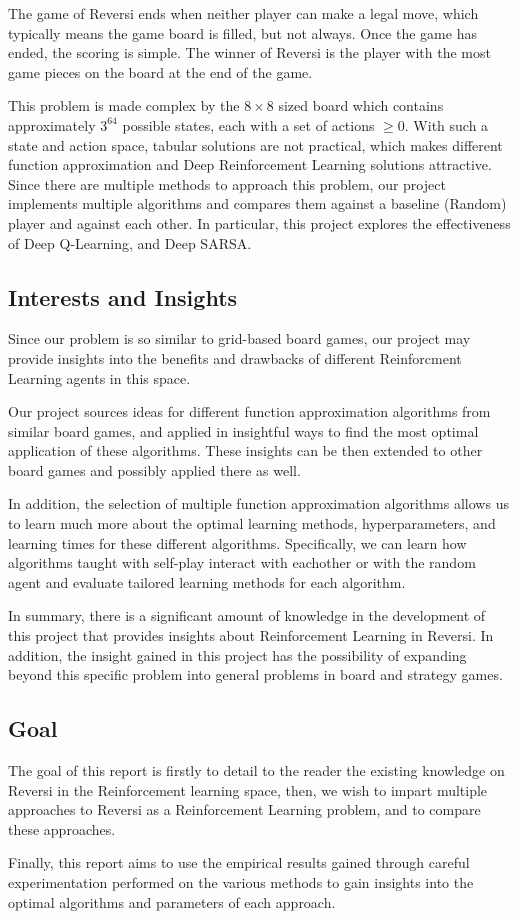 \documentclass[../report.tex]{subfiles}
\begin{document}
The game of Reversi ends when neither player can make a legal move, which typically means the game board is filled, but not always. Once the game has ended, the scoring is simple. The winner of Reversi is the player with the most game pieces on the board at the end of the game.


This problem is made complex by the $8\times8$ sized board which contains approximately $3^{64}$ possible states, each with a set of actions $\geq0$. With such a state and action space, tabular solutions are not practical, which makes different function approximation and Deep Reinforcement Learning solutions attractive. Since there are multiple methods to approach this problem, our project implements multiple algorithms and compares them against a baseline (Random) player and against each other. In particular, this project explores the effectiveness of Deep Q-Learning, and Deep SARSA. 

\subsection{Interests and Insights}

Since our problem is so similar to grid-based board games, our project may provide insights into the benefits and drawbacks of different Reinforcment Learning agents in this space.


Our project sources ideas for different function approximation algorithms from similar board games, and applied in insightful ways to  find the most optimal application of these algorithms. These insights can be then extended to other board games and possibly applied there as well.


In addition, the selection of multiple function approximation algorithms allows us to learn much more about the optimal learning methods, hyperparameters, and learning times for these different algorithms. Specifically, we can learn how algorithms taught with self-play interact with eachother or with the random agent and evaluate tailored learning methods for each algorithm.


In summary, there is a significant amount of knowledge in the development of this project that provides insights about Reinforcement Learning in Reversi. In addition, the insight gained in this project has the possibility of expanding beyond this specific problem into general problems in board and strategy games.


\subsection{Goal}
The goal of this report is firstly to detail to the reader the existing knowledge on Reversi in the Reinforcement learning space, then, we wish to impart multiple approaches to Reversi as a Reinforcement Learning problem, and to compare these approaches.

Finally, this report aims to use the empirical results gained through careful experimentation performed on the various methods to gain insights into the optimal algorithms and parameters of each approach.
\end{document}
